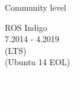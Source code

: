 \documentclass{beamer}
\begin{document}
\begin{frame}{Community level}
\begin{textblock}{3}
         \centering
         ROS Indigo\\
         \footnotesize 7.2014 - 4.2019\\
         (LTS)\\
         (Ubuntu 14 EOL)\\
     \end{textblock}                       
\end{frame}

\begin{frame}[plain]{}  
    \centering
    {\huge \textcolor{white}{Thank you}}
    
    \vspace{0.5cm}
    
    {\huge \textcolor{white}{Any questions?}}
\end{frame}
\end{document}
